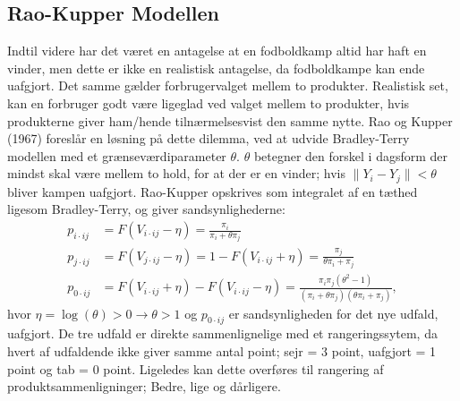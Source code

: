\documentclass[11pt,a4paper]{article}
\begin{document}
\subsection{Rao-Kupper Modellen}
Indtil videre har det været en antagelse at en fodboldkamp altid har haft en vinder, men dette er ikke en realistisk antagelse, da fodboldkampe kan ende uafgjort. Det samme gælder forbrugervalget mellem to produkter. Realistisk set, kan en forbruger godt være ligeglad ved valget mellem to produkter, hvis produkterne giver ham/hende tilnærmelsesvist den samme nytte. Rao og Kupper (1967) \cite{RaoKupper} foreslår en løsning på dette dilemma, ved at udvide Bradley-Terry modellen med et grænseværdiparameter $\theta$. $\theta$ betegner den forskel i dagsform der mindst skal være mellem to hold, for at der er en vinder; hvis $\|Y_i-Y_j\| < \theta$ bliver kampen uafgjort. Rao-Kupper opskrives som integralet af en tæthed ligesom Bradley-Terry, og giver sandsynlighederne:
\begin{equation}
\begin{split}
    p_{i\cdot ij}&=F(V_{i\cdot ij}-\eta)=\frac{\pi_i}{\pi_i+\theta \pi_j}\\
    p_{j\cdot ij}&=F(V_{j\cdot ij}-\eta)=1-F(V_{i\cdot ij}+\eta)=\frac{\pi_j}{\theta \pi_i+\pi_j}\\
    p_{0\cdot ij}&=F(V_{i\cdot ij}+\eta)-F(V_{i\cdot ij}-\eta)= \frac{\pi_i \pi_j(\theta^2 -1)}{(\pi_i+\theta \pi_j)(\theta \pi_i + \pi_j)} \label{Sandynligheder},
\end{split}
\end{equation}
hvor $\eta=\log(\theta)>0 \rightarrow\theta>1$ og $p_{0\cdot ij}$ er sandsynligheden for det nye udfald, uafgjort. De tre udfald er direkte sammenlignelige med et rangeringssytem, da hvert af udfaldende ikke giver samme antal point; sejr = 3 point, uafgjort = 1 point og tab = 0 point. Ligeledes kan dette overføres til rangering af produktsammenligninger; Bedre, lige og dårligere. 
\end{document}
